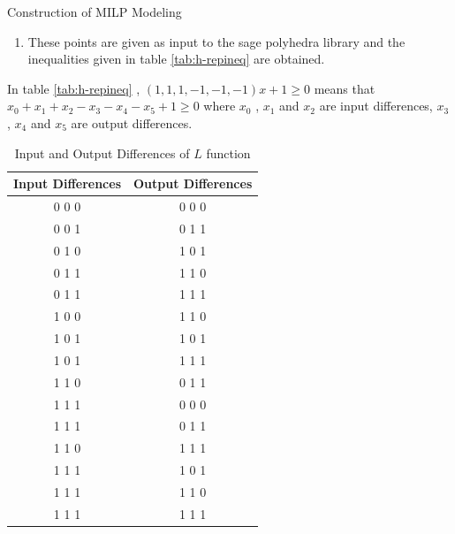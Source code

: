 \begin{section}{Construction of MILP Modeling}
\begin{enumerate}
    \item These points are given as input to the sage polyhedra library and the inequalities given in table \ref{tab:h-repineq} are obtained.
    
\end{enumerate}

In table \ref{tab:h-repineq} ,  $(1, 1, 1, -1, -1, -1) x + 1 \geq 0$ means that $ x_0 + x_1 + x_2 -x_3 - x_4 -x_5 +1 \geq 0 $ where $x_0$ , $x_1$ and $x_2$ are input differences, $x_3$ , $x_4$ and $x_5$ are output differences.  

\begin{table}[h]
\centering
\begin{tabular}{|c|c|}
\hline
\textbf{Input Differences} & \textbf{Output Differences} \\ \hline
0 0 0 & 0 0 0 \\ \hline
0 0 1 & 0 1 1 \\ \hline
0 1 0 & 1 0 1 \\ \hline
0 1 1 & 1 1 0 \\ \hline
0 1 1 & 1 1 1 \\ \hline
1 0 0 & 1 1 0 \\ \hline
1 0 1 & 1 0 1 \\ \hline
1 0 1 & 1 1 1 \\ \hline
1 1 0 & 0 1 1 \\ \hline
1 1 1 & 0 0 0 \\ \hline
1 1 1 & 0 1 1 \\ \hline
1 1 0 & 1 1 1 \\ \hline
1 1 1 & 1 0 1 \\ \hline
1 1 1 & 1 1 0 \\ \hline
1 1 1 & 1 1 1 \\ \hline
\end{tabular}
\caption{Input and Output Differences of $L$ function}
\label{tab:hreptab}
\end{table}


\end{section}
